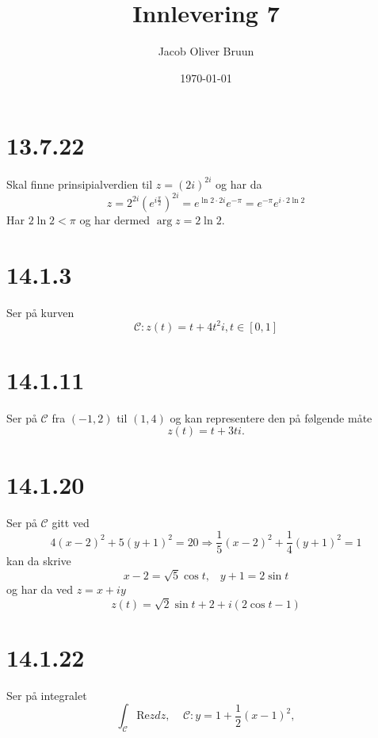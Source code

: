 \documentclass{report}
\title{Innlevering 7}
\author{Jacob Oliver Bruun}
\date{\today}
\newcommand{\nbrack}[1]{\left( #1 \right)}
\newcommand{\bbrack}[1]{\left[ #1 \right]}
\newcommand{\re}{\text{Re}}
\begin{document}
\section*{13.7.22}
Skal finne prinsipialverdien til $z=(2i)^{2i}$ og har da
\begin{equation}
  \label{eq:1}
  z = 2^{2i} \nbrack{ e^{i\frac{\pi}{2}} }^{2i} = e^{\ln 2 \cdot 2i} e^{-\pi} = e^{-\pi}e^{i\cdot 2\ln 2}
\end{equation}
Har $2\ln 2 < \pi$ og har dermed $\arg z = 2\ln 2$.


\section*{14.1.3}
Ser på kurven
\begin{equation}
  \label{eq:2}
  \mathcal{C} : z(t) = t + 4t^{2}i, t \in \bbrack{ 0, 1 }
\end{equation}


\section*{14.1.11}
Ser på $\mathcal{C}$ fra $(-1,2)$ til $(1,4)$ og kan representere den på følgende måte
\begin{equation}
  \label{eq:3}
  z(t) = t + 3ti.
\end{equation}



\section*{14.1.20}
Ser på $\mathcal{C}$ gitt ved
\begin{equation}
  \label{eq:4}
  4(x-2)^{2} + 5(y+1)^{2} = 20 \Rightarrow \frac{1}{5}(x-2)^{2} + \frac{1}{4}(y+1)^{2} = 1
\end{equation}
kan da skrive
\begin{equation}
  \label{eq:5}
  x-2 = \sqrt{5} \cos t, \;\;\; y+1 = 2 \sin t
\end{equation}
og har da ved $z = x + iy$
\begin{equation}
  \label{eq:6}
  z(t) = \sqrt{2} \sin t + 2 + i\nbrack{ 2\cos t - 1 }
\end{equation}


\section*{14.1.22}
Ser på integralet
\begin{equation}
  \label{eq:7}
  \int_{\mathcal{C}} \re z dz, \;\;\;\; \mathcal{C} : y = 1 + \frac{1}{2}(x-1)^{2},
\end{equation}
\end{document}
